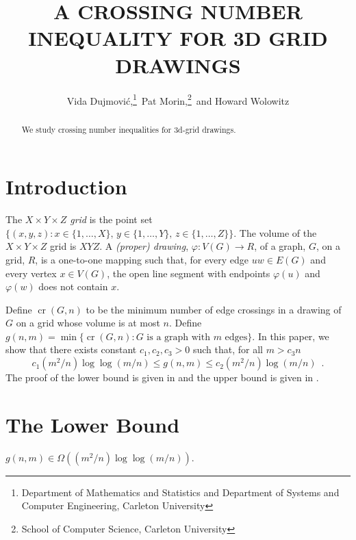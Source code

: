 \documentclass{patmorin}
\title{\MakeUppercase{A Crossing Number Inequality for 3D Grid Drawings}}
\author{Vida Dujmovi\'c,\thanks{Department of Mathematics and Statistics
and Department of Systems and Computer Engineering, Carleton University}\, Pat Morin,\thanks{School of Computer Science, Carleton University}\, and Howard Wolowitz}
\DeclareMathOperator{\crs}{cr}
\begin{document}
\maketitle

\begin{abstract}
   We study crossing number inequalities for 3d-grid drawings.
\end{abstract}

\section{Introduction}

The \emph{$X\times Y\times Z$ grid} is the point set $\{(x,y,z):
x\in\{1,\ldots,X\},\, y\in\{1,\ldots,Y\},\, z\in\{1,\ldots,Z\}\}$.
The volume of the $X\times Y\times Z$ grid is $XYZ$. A \emph{(proper)
drawing}, $\varphi:V(G)\rightarrow R$, of a graph, $G$, on a grid, $R$,
is a one-to-one mapping such that, for every edge $uw\in E(G)$ and every
vertex $x\in V(G)$, the open line segment with endpoints $\varphi(u)$
and $\varphi(w)$ does not contain $x$.

Define $\crs(G,n)$ to be the minimum number of edge crossings in
a drawing of $G$ on a grid whose volume is at most $n$.  Define
$g(n,m)=\min\{\crs(G,n):\text{$G$ is a graph with $m$ edges}\}$.
In this paper, we show that there exists constant $c_1,c_2,c_3>0$ such that, 
for all $m> c_3n$
\[
   c_1(m^2/n)\log\log(m/n) \le g(n,m) \le c_2(m^2/n)\log(m/n) \enspace .
\]
The proof of the lower bound is given in  and the
upper bound is given in .



\section{The Lower Bound}

\begin{thm}
  $g(n,m) \in \Omega((m^2/n)\log\log (m/n))$.
\end{thm}
\end{document}
